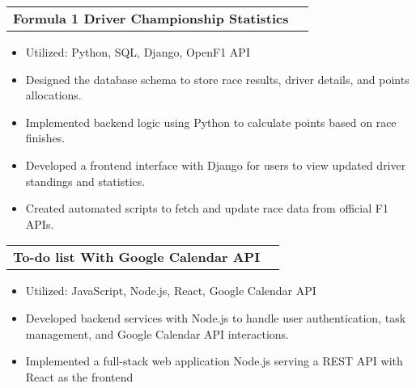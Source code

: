 \documentclass[letterpaper,11pt]{article}
\makeatletter
\newcommand{\resumeItem}[1]{
  \item\small{
    {#1 \vspace{-3pt}}
  }
}
\newcommand{\resumeProjectHeading}[2]{
    \item
    \begin{tabular*}{0.97\textwidth}{l@{\extracolsep{\fill}}r@{\hspace{-0.2in}}}
        \small#1 & #2 \\
    \end{tabular*}\vspace{-7pt}
}
\newcommand{\resumeItemListStart}{\begin{itemize}[leftmargin=0.15in, rightmargin=0.15in]}
\newcommand{\resumeItemListEnd}{\end{itemize}\vspace{-3pt}}
\makeatother
\begin{document}

        \resumeProjectHeading
            {\textbf{Formula 1 Driver Championship Statistics} {}}{}
            \resumeItemListStart
                \resumeItem{Utilized: Python, SQL, Django, OpenF1 API}
                \resumeItem{Designed the database schema to store race results, driver details, and points allocations.}
                \resumeItem{Implemented backend logic using Python to calculate points based on race finishes.}
                \resumeItem{Developed a frontend interface with Django for users to view updated driver standings and statistics.}            
                \resumeItem{Created automated scripts to fetch and update race data from official F1 APIs.}            
            \resumeItemListEnd


        \resumeProjectHeading
            {\textbf{To-do list With Google Calendar API} {}}{}
            \resumeItemListStart
                \resumeItem{Utilized: JavaScript, Node.js, React, Google Calendar API}
                \resumeItem{Developed backend services with Node.js to handle user authentication, task management, and Google Calendar API interactions.}
                \resumeItem{Implemented a full-stack web application Node.js serving a REST API with React as the frontend}
            \resumeItemListEnd
        
\end{document}
